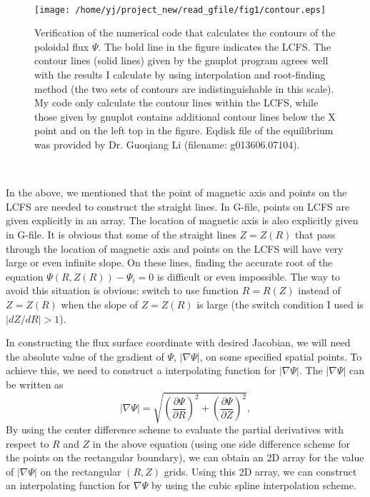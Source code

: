 \documentclass{llncs}
\begin{document}
\

\begin{figure}[h]
  \texttt{[image: /home/yj/project\_new/read\_gfile/fig1/contour.eps]}
  \caption{\label{4-3-p2}Verification of the numerical code that calculates
  the contours of the poloidal flux $\Psi$. The bold line in the figure
  indicates the LCFS. The contour lines (solid lines) given by the gnuplot
  program agrees well with the results I calculate by using interpolation and
  root-finding method (the two sets of contours are indistinguishable in this
  scale). My code only calculate the contour lines within the LCFS, while
  those given by gnuplot contains additional contour lines below the X point
  and on the left top in the figure. Eqdisk file of the equilibrium was
  provided by Dr. Guoqiang Li (filename: g013606.07104).}
\end{figure}

\

In the above, we mentioned that the point of magnetic axis and points on the
LCFS are needed to construct the straight lines. In G-file, points on LCFS are
given explicitly in an array. The location of magnetic axis is also explicitly
given in G-file. It is obvious that some of the straight lines $Z = Z (R)$
that pass through the location of magnetic axis and points on the LCFS will
have very large or even infinite slope. On these lines, finding the accurate
root of the equation $\Psi (R, Z (R)) - \Psi_i = 0$ is difficult or even
impossible. The way to avoid this situation is obvious: switch to use function
$R = R (Z)$ instead of $Z = Z (R)$ when the slope of $Z = Z (R)$ is large (the
switch condition I used is $|d Z / d R| > 1$).

In constructing the flux surface coordinate with desired Jacobian, we will
need the absolute value of the gradient of $\Psi$, $| \nabla \Psi |$, on some
specified spatial points. To achieve this, we need to construct a
interpolating function for $| \nabla \Psi |$. The $| \nabla \Psi |$ can be
written as
\begin{equation}
  | \nabla \Psi | = \sqrt{\left( \frac{\partial \Psi}{\partial R} \right)^2 +
  \left( \frac{\partial \Psi}{\partial Z} \right)^2},
\end{equation}
By using the center difference scheme to evaluate the partial derivatives with
respect to $R$ and $Z$ in the above equation (using one side difference scheme
for the points on the rectangular boundary), we can obtain an 2D array for the
value of $| \nabla \Psi |$ on the rectangular $(R, Z)$ grids. Using this 2D
array, we can construct an interpolating function for $\nabla \Psi$ by using
the cubic spline interpolation scheme.
\end{document}
